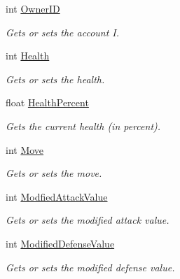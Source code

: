 \begin{DoxyCompactItemize}
int \hyperlink{classCore_1_1Models_1_1Entity_adf44e0bd8e2a08cf13fcd6a783f783e5}{Owner\+I\+D}
\begin{DoxyCompactList}\small\item\em Gets or sets the account I. \end{DoxyCompactList}\item 
int \hyperlink{classCore_1_1Models_1_1Entity_ac054f7e992fe65ae3ffa998e4d4d1225}{Health}
\begin{DoxyCompactList}\small\item\em Gets or sets the health. \end{DoxyCompactList}\item 
float \hyperlink{classCore_1_1Models_1_1Entity_a05336fa3c927b9f1c299f55ec27a6e0c}{Health\+Percent}
\begin{DoxyCompactList}\small\item\em Gets the current health (in percent). \end{DoxyCompactList}\item 
int \hyperlink{classCore_1_1Models_1_1Entity_a3a1f85a3d32a2decd04919d03fb84167}{Move}
\begin{DoxyCompactList}\small\item\em Gets or sets the move. \end{DoxyCompactList}\item 
int \hyperlink{classCore_1_1Models_1_1Entity_a7480e9bdfa56f0a21e784bf5cadcf3cd}{Modfied\+Attack\+Value}
\begin{DoxyCompactList}\small\item\em Gets or sets the modified attack value. \end{DoxyCompactList}\item 
int \hyperlink{classCore_1_1Models_1_1Entity_a7bb3bab5756906f8202f48d9644fc9aa}{Modified\+Defense\+Value}
\begin{DoxyCompactList}\small\item\em Gets or sets the modified defense value. \end{DoxyCompactList}\end{DoxyCompactItemize}

